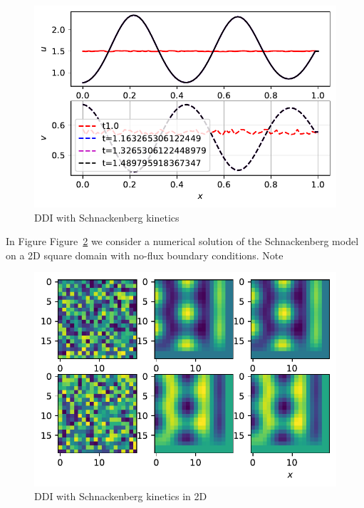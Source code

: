 \documentclass[
  letterpaper,
  DIV=11,
  numbers=noendperiod]{scrreprt}
\theoremstyle{definition}
\theoremstyle{plain}
\theoremstyle{plain}
\theoremstyle{remark}
\begin{document}
\begin{figure}

{\centering \includegraphics{DiffusionDrivenInstability_files/figure-pdf/fig-schnack_ddi_pde-output-1.pdf}

}

\caption{\label{fig-schnack_ddi_pde}DDI with Schnackenberg kinetics}

\end{figure}

In Figure Figure~\ref{fig-schnack_ddi_pde_2d} we consider a numerical
solution of the Schnackenberg model on a 2D square domain with no-flux
boundary conditions. Note

\begin{figure}

{\centering \includegraphics{DiffusionDrivenInstability_files/figure-pdf/fig-schnack_ddi_pde_2d-output-1.pdf}

}

\caption{\label{fig-schnack_ddi_pde_2d}DDI with Schnackenberg kinetics
in 2D}

\end{figure}
\end{document}
